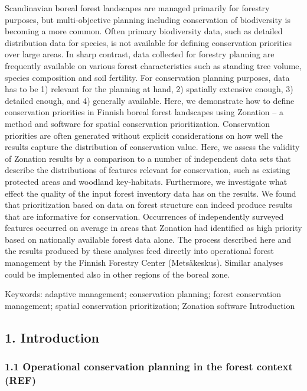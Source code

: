\documentclass[]{article}
\begin{document}
Scandinavian boreal forest landscapes are managed primarily for forestry
purposes, but multi-objective planning including conservation of
biodiversity is becoming a more common. Often primary biodiversity data,
such as detailed distribution data for species, is not available for
defining conservation priorities over large areas. In sharp contrast,
data collected for forestry planning are frequently available on various
forest characteristics such as standing tree volume, species composition
and soil fertility. For conservation planning purposes, data has to be
1) relevant for the planning at hand, 2) spatially extensive enough, 3)
detailed enough, and 4) generally available. Here, we demonstrate how to
define conservation priorities in Finnish boreal forest landscapes using
Zonation -- a method and software for spatial conservation
prioritization. Conservation priorities are often generated without
explicit considerations on how well the results capture the distribution
of conservation value. Here, we assess the validity of Zonation results
by a comparison to a number of independent data sets that describe the
distributions of features relevant for conservation, such as existing
protected areas and woodland key-habitats. Furthermore, we investigate
what effect the quality of the input forest inventory data has on the
results. We found that prioritization based on data on forest structure
can indeed produce results that are informative for conservation.
Occurrences of independently surveyed features occurred on average in
areas that Zonation had identified as high priority based on nationally
available forest data alone. The process described here and the results
produced by these analyses feed directly into operational forest
management by the Finnish Forestry Center (Metsäkeskus). Similar
analyses could be implemented also in other regions of the boreal zone.

Keywords: adaptive management; conservation planning; forest
conservation management; spatial conservation prioritization; Zonation
software Introduction

\subsection{1. Introduction}

\subsubsection{1.1 Operational conservation planning in the forest
context (REF)}
\end{document}
